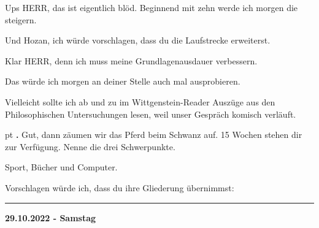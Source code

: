 \documentclass[10pt,a4paper]{article}
\newcounter{notec}
\newcommand\notep[1]{%
  \stepcounter{notec}
  \vskip #1pt
  {\bf\arabic{notec}.}
}
\newcommand\rele[1] {{\color {english} \bf {#1}}}              %
\newcommand\ddivide {\vskip -9pt \hrule \vskip 6pt}
\begin{document}
\begin{mdframed}[style=daystyle]
  \vskip 2pt
  Ups HERR, das ist eigentlich blöd. Beginnend mit zehn werde ich morgen die
  steigern.

  \vskip 2pt
  Und Hozan, ich würde vorschlagen, dass du die Laufstrecke erweiterst.

  \vskip 2pt
  Klar HERR, denn ich muss meine Grundlagenausdauer verbessern.

  \vskip 2pt
  Das würde ich morgen an deiner Stelle auch mal ausprobieren.

  \vskip 2pt
  Vielleicht sollte ich ab und zu im Wittgenstein-Reader Auszüge aus den
  Philosophischen Untersuchungen lesen, weil unser Gespräch komisch verläuft.


  \notep 4 Gut, dann zäumen wir das Pferd beim Schwanz auf. 15 Wochen stehen dir
  zur Verfügung. Nenne die drei Schwerpunkte.

  \vskip 2pt
  Sport, Bücher und Computer.

  \vskip 2pt
  Vorschlagen würde ich, dass du ihre Gliederung übernimmst:
\end{mdframed}


\ddivide
{\rele {29.10.2022 - Samstag}}
\end{document}
